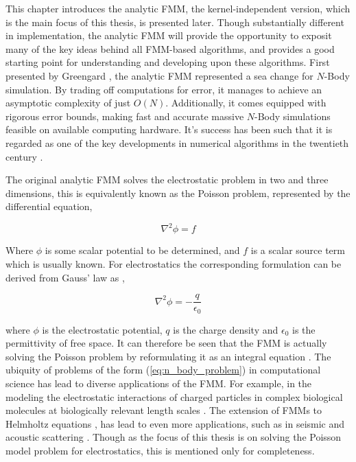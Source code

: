 This chapter introduces the analytic \gls{FMM}, the kernel-independent
version, which is the main focus of this thesis, is presented later.
Though substantially different in implementation, the analytic FMM will provide the opportunity
to exposit many of the key ideas behind all FMM-based algorithms, and provides
a good starting point for understanding and developing upon these algorithms.
First presented by Greengard \cite{Greengard:1987:JCP},
the analytic \gls{FMM} represented a sea change for $N$-Body simulation. By
trading off computations for error, it manages to achieve an asymptotic complexity
 of just $O(N)$. Additionally, it comes equipped with rigorous error bounds,
making fast and accurate massive $N$-Body simulations feasible on available
computing hardware. It's success has been such that it is regarded as one of
the key developments in numerical algorithms in the twentieth century \cite{Cipra:2000:SN}.

The original analytic FMM solves the electrostatic problem
in two and three dimensions, this is equivalently known as the Poisson problem,
represented by the differential equation,

\begin{equation}
    \nabla^2 \phi =f
\label{eq:poisson}
\end{equation}

Where $\phi$ is some scalar potential to be determined, and $f$ is a scalar source
term which is usually known. For electrostatics the corresponding formulation
can be derived from Gauss' law as \cite{Griffiths:2017:CUP},

\begin{equation}
  \nabla^2 \phi = - \frac{q}{\epsilon_0}
\label{eq:electrostatic_poisson}
\end{equation}

where $\phi$ is the electrostatic potential, $q$ is the charge density and
$\epsilon_0$ is the permittivity of free space. It can therefore be seen that
the \gls{FMM} is actually solving the Poisson problem by reformulating it as an
integral equation \cite{Epton:1995:SIAM}. The ubiquity of problems of the form (\ref{eq:n_body_problem})
in computational science has lead to diverse applications of the FMM. For example,
in the modeling the electrostatic interactions of charged particles in complex
biological molecules at biologically relevant length scales \cite{Board:1992:CPL}.
The extension of FMMs to Helmholtz equations \cite{Rokhlin:1990:JCP}, has lead
to even more applications, such as in seismic and acoustic scattering
\cite{Hwu:2011:MKP}. Though as the focus of this thesis is on solving the Poisson
model problem for electrostatics, this is mentioned only for completeness.

